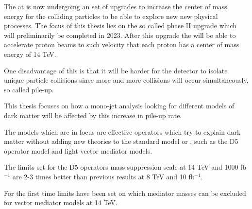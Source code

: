 The \abbrLHC at \abbrCERN is now undergoing an set of upgrades to increase the center of mass energy for the colliding particles to be able to explore new new physical processes. The focus of this thesis lies on the so called phase II upgrade which will preliminarily be completed in 2023. After this upgrade the \abbrLHC will be able to accelerate proton beams to such velocity that each proton has a center of mass energy of 14 TeV.

One disadvantage of this is that it will be harder for the \abbrATLAS detector to isolate unique particle collisions since more and more collisions will occur simultaneously, so called pile-up. 

This thesis focuses on how a mono-jet analysis looking for different \abbrWIMP models of dark matter will be affected by this increase in pile-up rate.

The models which are in focus are effective operators which try to explain dark matter without adding new theories to the standard model or \abbrQFT , such as the D5 operator model and light vector mediator models.

The limits set for the D5 operators mass suppression scale at 14 TeV and 1000 fb$^{-1}$ are 2-3 times better than previous results at 8 TeV and 10 fb$^{-1}$. 

For the first time limits have been set on which mediator masses can be excluded for vector mediator models at 14 TeV.